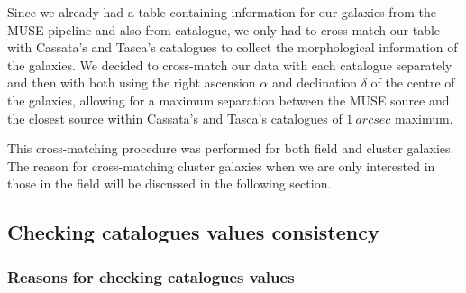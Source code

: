 Since we already had a table containing information for our galaxies from the MUSE pipeline and also from  catalogue, we only had to cross-match our table with Cassata's and Tasca's catalogues to collect the morphological information of the galaxies. We decided to cross-match our data with each catalogue separately and then with both using the right ascension $\alpha$ and declination $\delta$ of the centre of the galaxies, allowing for a maximum separation between the MUSE source and the closest source within Cassata's and Tasca's catalogues of $\SI{1}{arcsec}$ maximum. 

This cross-matching procedure was performed for both field and cluster galaxies. The reason for cross-matching cluster galaxies when we are only interested in those in the field will be discussed in the following section.

\subsection{Checking catalogues values consistency}
\subsubsection{Reasons for checking catalogues values}

